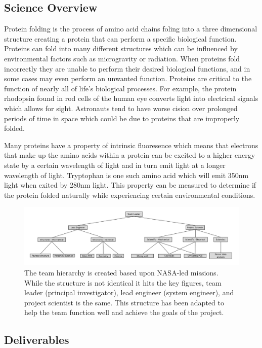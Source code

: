 \documentclass[conference]{IEEEtran} %
\begin{document}
\subsection{Science Overview}
\label{subsec:science}

Protein folding is the process of amino acid chains foling into a three dimensional structure creating a protein that can perform a specific biological function. Proteins can fold
into many different structures which can be influenced by environmental factors such as microgravity or radiation. When proteins fold incorrectly they are unable to perform their 
desired biological functions, and in some cases may even perform an unwanted function. Proteins are critical to the function of nearly all of life's biological processes. For example, 
the protein rhodopsin found in rod cells of the human eye converts light into electrical signals which allows for sight. Astronauts tend to have worse cision over prolonged periods of 
time in space which could be due to proteins that are improperly folded. 

Many proteins have a property of intrinsic fluoresence which means that electrons that make up the amino acids within a protein can be excited to a higher energy state by a certain 
wavelength of light and in turn emit light at a longer wavelength of light. Tryptophan is one such amino acid which will emit 350nm light when exited by 280nm light. This property can 
be measured to determine if the protein folded naturally while experiencing certain environmental conditions.

\begin{figure}
  \includegraphics[width = \columnwidth]{figs/team_hierarchy.png}
  \caption{The team hierarchy is created based upon NASA-led missions. While the structure is not identical it hits the key figures, team leader (principal investigator), lead engineer
  (system engineer), and project scientist is the same. This structure has been adapted to help the team function well and achieve the goals of the project.}
  \label{fig:hierarchy}
\end{figure}

\subsection{Deliverables}
\label{subsec:deliverables}
\end{document}
